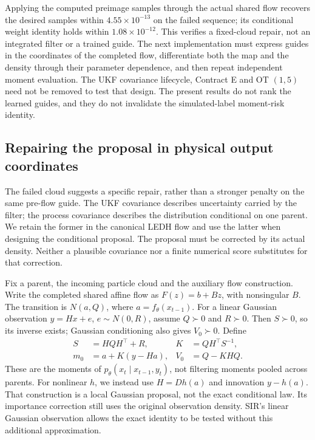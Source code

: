 Applying the computed preimage samples through the actual shared flow
recovers the desired samples within $4.55\times10^{-13}$ on the failed
sequence; its conditional weight identity holds within $1.08\times10^{-12}$.
This verifies a fixed-cloud repair, not an integrated filter or a trained
guide. The next implementation must express guides in the coordinates of
the completed flow, differentiate both the map and the density through their
parameter dependence, and then repeat independent moment evaluation. The
UKF covariance lifecycle, Contract E and OT $(1,5)$ need not be removed to
test that design. The present results do not rank the learned guides, and
they do not invalidate the simulated-label moment-risk identity.

\subsection{Repairing the proposal in physical output coordinates}
\label{sec:sg-physical-repair}

The failed cloud suggests a specific repair, rather than a stronger penalty
on the same pre-flow guide. The UKF covariance describes uncertainty carried
by the filter; the process covariance describes the distribution conditional
on one parent. We retain the former in the canonical LEDH flow and use the
latter when designing the conditional proposal. The proposal must be corrected
by its actual density. Neither a plausible covariance nor a finite numerical
score substitutes for that correction.

Fix a parent, the incoming particle cloud and the auxiliary flow construction.
Write the completed shared affine flow as $F(z)=b+Bz$, with nonsingular $B$.
The transition is $N(a,Q)$, where $a=f_\theta(x_{t-1})$. For a linear Gaussian
observation $y=Hx+e$, $e\sim N(0,R)$, assume $Q\succ0$ and $R\succ0$.
Then $S\succ0$, so its inverse exists; Gaussian conditioning also gives
$V_0\succ0$. Define
\begin{align}
 S&=HQH^\top+R, & K&=QH^\top S^{-1},\label{eq:sg-physical-conditional}\\
 m_0&=a+K(y-Ha), & V_0&=Q-KHQ.\nonumber
\end{align}
These are the moments of $p_\theta(x_t\mid x_{t-1},y_t)$, not filtering
moments pooled across parents. For nonlinear $h$, we instead use
$H=Dh(a)$ and innovation $y-h(a)$. That construction is a local Gaussian
proposal, not the exact conditional law. Its importance correction still
uses the original observation density. SIR's linear Gaussian observation
allows the exact identity to be tested without this additional approximation.

